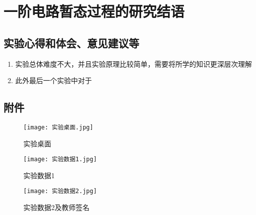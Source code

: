 \documentclass[dvipsnames, svgnames,a4paper,11pt]{article}
\begin{document}
	
	\clearpage
	
	\section{一阶电路暂态过程的研究\quad\heiti 结语}
	
	\subsection{实验心得和体会、意见建议等}
	\begin{enumerate}
		\item 实验总体难度不大，并且实验原理比较简单，需要将所学的知识更深层次理解
		\item 此外最后一个实验中对于
	\end{enumerate}
	

	\subsection{附件}
	\begin{figure}[H]
		\centering
		\begin{minipage}{0.3\linewidth}
			\centering
			\texttt{[image: 实验桌面.jpg]}
			\caption{实验桌面}
		\end{minipage}
		\hfill
		\begin{minipage}{0.3\linewidth}
			\centering
			\texttt{[image: 实验数据1.jpg]}
			\caption{实验数据1}
		\end{minipage}
		\hfill
		\begin{minipage}{0.3\linewidth}
			\centering
			\texttt{[image: 实验数据2.jpg]}
			\caption{实验数据2及教师签名}
		\end{minipage}
	\end{figure}
	
	
	
	
\end{document}
